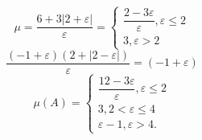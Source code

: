 \documentclass[14pt, titlepage,fleqn]{extarticle}
\begin{document}
\[\mu = \dfrac{6+3|2+\varepsilon|}{\varepsilon} = \begin{cases}
	\dfrac{2-3\varepsilon}{\varepsilon}, \varepsilon \leq 2\\
	3, \varepsilon > 2
\end{cases}\]
\[\dfrac{(-1+\varepsilon)(2+|2-\varepsilon|)}{\varepsilon} = (-1 + \varepsilon)\]
\[\mu(A) = \begin{cases}
	\dfrac{12 - 3\varepsilon}{\varepsilon}, \varepsilon \leq 2\\
	3, 2<\varepsilon \leq 4\\
	\varepsilon - 1,\varepsilon > 4.
\end{cases}\]
\end{document}
